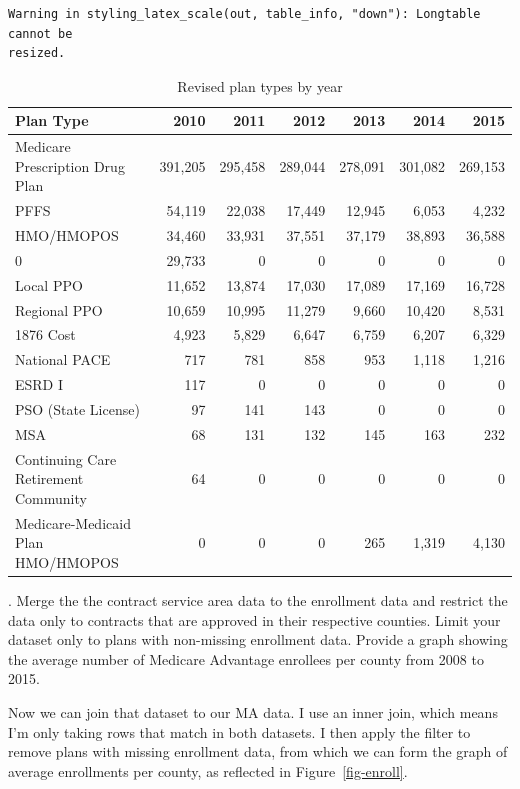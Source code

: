 \documentclass[
  letterpaper,
  DIV=11,
  numbers=noendperiod]{scrartcl}
\begin{document}
\begin{verbatim}
Warning in styling_latex_scale(out, table_info, "down"): Longtable cannot be
resized.
\end{verbatim}

\begin{longtable}[t]{lrrrrrr}

\caption{\label{tbl-plans2}Revised plan types by year}

\tabularnewline

\toprule
Plan Type & 2010 & 2011 & 2012 & 2013 & 2014 & 2015\\
\midrule
Medicare Prescription Drug Plan & 391,205 & 295,458 & 289,044 & 278,091 & 301,082 & 269,153\\
PFFS & 54,119 & 22,038 & 17,449 & 12,945 & 6,053 & 4,232\\
HMO/HMOPOS & 34,460 & 33,931 & 37,551 & 37,179 & 38,893 & 36,588\\
0 & 29,733 & 0 & 0 & 0 & 0 & 0\\
Local PPO & 11,652 & 13,874 & 17,030 & 17,089 & 17,169 & 16,728\\
\addlinespace
Regional PPO & 10,659 & 10,995 & 11,279 & 9,660 & 10,420 & 8,531\\
1876 Cost & 4,923 & 5,829 & 6,647 & 6,759 & 6,207 & 6,329\\
National PACE & 717 & 781 & 858 & 953 & 1,118 & 1,216\\
ESRD I & 117 & 0 & 0 & 0 & 0 & 0\\
PSO (State License) & 97 & 141 & 143 & 0 & 0 & 0\\
\addlinespace
MSA & 68 & 131 & 132 & 145 & 163 & 232\\
Continuing Care Retirement Community & 64 & 0 & 0 & 0 & 0 & 0\\
Medicare-Medicaid Plan HMO/HMOPOS & 0 & 0 & 0 & 265 & 1,319 & 4,130\\
\bottomrule

\end{longtable}

\newpage

. Merge the the contract service area data to the enrollment
data and restrict the data only to contracts that are approved in their
respective counties. Limit your dataset only to plans with non-missing
enrollment data. Provide a graph showing the average number of Medicare
Advantage enrollees per county from 2008 to 2015.

Now we can join that dataset to our MA data. I use an inner join, which
means I'm only taking rows that match in both datasets. I then apply the
filter to remove plans with missing enrollment data, from which we can
form the graph of average enrollments per county, as reflected in
Figure~\ref{fig-enroll}.
\end{document}
